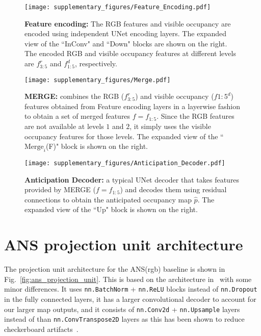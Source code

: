 \documentclass[runningheads]{llncs}
\newcommand{\code}[1]{\texttt{\small #1}}
\begin{document}
\begin{figure}[ht!]
    \centering
    \texttt{[image: supplementary\_figures/Feature\_Encoding.pdf]}
    \caption{\small\textbf{Feature encoding:} The RGB features and visible occupancy are encoded using independent UNet encoding layers. The expanded view of the ``InConv" and ``Down" blocks are shown on the right. The encoded RGB and visible occupancy features at different levels are $f_{3:5}^{r}$ and $f_{1:5}^{d}$, respectively.}
    \label{fig:feature_encoding}
\end{figure}

\begin{figure}[ht!]
    \centering
    \texttt{[image: supplementary\_figures/Merge.pdf]}
    \caption{\small \textbf{MERGE:} combines the RGB ($f_{3:5}^{r}$) and visible occupancy ($f{1:5}^{d}$) features obtained from Feature encoding layers in a layerwise fashion to obtain a set of merged features $f = f_{1:5}$. Since the RGB features are not available at levels $1$ and $2$, it simply uses the visible occupancy features for those levels. The expanded view of the ``$\text{Merge}_{i}$(F)" block is shown on the right.}
    \label{fig:merge}
\end{figure}

\begin{figure}[ht!]
    \centering
    \texttt{[image: supplementary\_figures/Anticipation\_Decoder.pdf]}
    \caption{\small \textbf{Anticipation Decoder:} a typical UNet decoder that takes features provided by MERGE ($f = f_{1:5}$) and decodes them using residual connections to obtain the anticipated occupancy map $\hat{p}$. The expanded view of the ``Up" block is shown on the right. }
    \label{fig:anticipation_decoder}
\end{figure}

\section{ANS projection unit architecture}
The projection unit architecture for the ANS(rgb) baseline is shown in Fig.~\ref{fig:ans_projection_unit}. This is based on the architecture in~\cite{chaplot2020learning} with some minor differences. It uses \code{nn.BatchNorm} + \code{nn.ReLU} blocks instead of \code{nn.Dropout} in the fully connected layers, it has a larger convolutional decoder to account for our larger map outputs, and it consists of \code{nn.Conv2d} + \code{nn.Upsample} layers instead of than \code{nn.ConvTranspose2D} layers as this has been shown to reduce checkerboard artifacts~\cite{odena2016deconvolution}.
\end{document}
